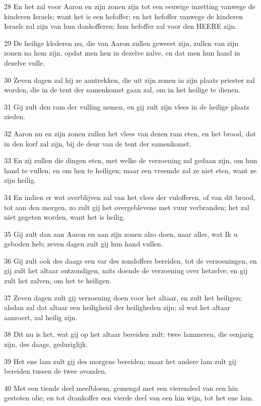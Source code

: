 \par 28 En het zal voor Aaron en zijn zonen zijn tot een eeuwige inzetting vanwege de kinderen Israels; want het is een hefoffer; en het hefoffer vanwege de kinderen Israels zal zijn van hun dankofferen; hun hefoffer zal voor den HEERE zijn.
\par 29 De heilige klederen nu, die van Aaron zullen geweest zijn, zullen van zijn zonen na hem zijn, opdat men hen in dezelve zalve, en dat men hun hand in dezelve vulle.
\par 30 Zeven dagen zal hij ze aantrekken, die uit zijn zonen in zijn plaats priester zal worden, die in de tent der samenkomst gaan zal, om in het heilige te dienen.
\par 31 Gij zult den ram der vulling nemen, en gij zult zijn vlees in de heilige plaats zieden.
\par 32 Aaron nu en zijn zonen zullen het vlees van dezen ram eten, en het brood, dat in den korf zal zijn, bij de deur van de tent der samenkomst.
\par 33 En zij zullen die dingen eten, met welke de verzoening zal gedaan zijn, om hun hand te vullen, en om hen te heiligen; maar een vreemde zal ze niet eten, want ze zijn heilig.
\par 34 En indien er wat overblijven zal van het vlees der vulofferen, of van dit brood, tot aan den morgen, zo zult gij het overgeblevene met vuur verbranden; het zal niet gegeten worden, want het is heilig.
\par 35 Gij zult dan aan Aaron en aan zijn zonen alzo doen, naar alles, wat Ik u geboden heb; zeven dagen zult gij hun hand vullen.
\par 36 Gij zult ook des daags een var des zondoffers bereiden, tot de verzoeningen, en gij zult het altaar ontzondigen, mits doende de verzoening over hetzelve; en gij zult het zalven, om het te heiligen.
\par 37 Zeven dagen zult gij verzoening doen voor het altaar, en zult het heiligen; alsdan zal dat altaar een heiligheid der heiligheden zijn; al wat het altaar aanroert, zal heilig zijn.
\par 38 Dit nu is het, wat gij op het altaar bereiden zult: twee lammeren, die eenjarig zijn, des daags, geduriglijk.
\par 39 Het ene lam zult gij des morgens bereiden; maar het andere lam zult gij bereiden tussen de twee avonden.
\par 40 Met een tiende deel meelbloem, gemengd met een vierendeel van een hin gestoten olie; en tot drankoffer een vierde deel van een hin wijn, tot het ene lam.
